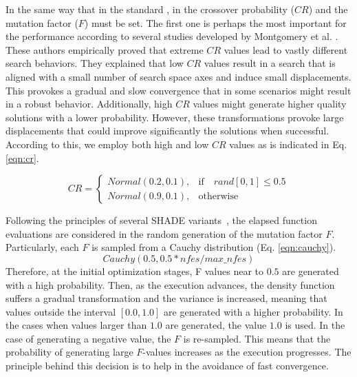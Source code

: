 %
In the same way that in the standard \DE{}, in \DEEDM{} the crossover probability ($CR$) and the mutation factor ($F$) must be set.
%
The first one is perhaps the most important for the performance according to several studies developed by Montgomery 
et al. \cite{montgomery2010analysis}.
%
These authors empirically proved that extreme $CR$ values lead to vastly different search behaviors.
%
They explained that low $CR$ values result in a search that is aligned with a small number of search space axes and
induce small displacements.
%
This provokes a gradual and slow convergence that in some scenarios might result in a robust behavior.
%
Additionally, high $CR$ values might generate higher quality solutions with a lower probability.
%
However, these transformations provoke large displacements that could improve significantly the solutions when successful.
%
According to this, we employ both high and low $CR$ values as is indicated in Eq. \ref{eqn:cr}.

\begin{equation} \label{eqn:cr}
CR = 
\begin{cases}
     Normal(0.2, 0.1),& \text{if} \quad rand[0,1] \leq 0.5  \\
     Normal(0.9, 0.1),              & \text{otherwise}
\end{cases}
\end{equation}

Following the principles of several SHADE variants~\cite{awad2016ensemble, brest2016shade}, the elapsed
function evaluations are considered in the random generation of the mutation factor $F$.
%
Particularly, each $F$ is sampled from a Cauchy distribution (Eq. \ref{eqn:cauchy}).
\begin{equation}\label{eqn:cauchy}
 Cauchy(0.5, 0.5*nfes/max\_nfes)
\end{equation}
%
Therefore, at the initial optimization stages, F values near to $0.5$ are generated with a high probability.
%
Then, as the execution advances, the density function suffers a gradual transformation and the variance is increased, meaning
that values outside the interval $[0.0, 1.0]$ are generated with a higher probability.
%
In the cases when values larger than $1.0$ are generated, the value $1.0$ is used.
%
In the case of generating a negative value, the $F$ is re-sampled.
%
This means that the probability of generating large $F$-values increases as the execution progresses.
%
The principle behind this decision is to help in the avoidance of fast convergence.


